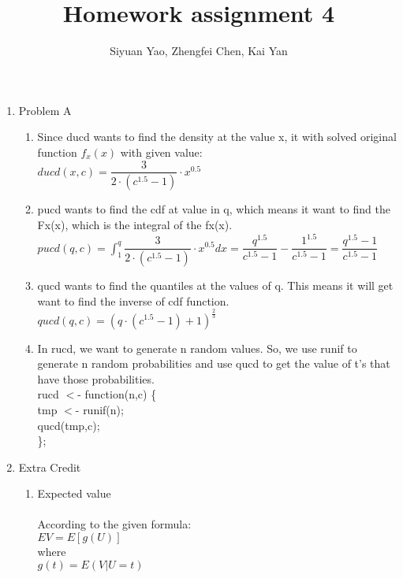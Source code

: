 \documentclass{amsart}
\newcommand\tab[1][1cm]{\hspace*{#1}}
\begin{document}
\title{Homework assignment 4}
\author{Siyuan Yao, Zhengfei Chen, Kai Yan}
\maketitle

\thispagestyle{empty}
\pagestyle{empty}

\begin{enumerate}
\item Problem A\\
\begin{enumerate}
\item Since ducd wants to find the density at the value x, it with solved original function $f_x(x)$ with given value:\\
$ducd(x,c)=\dfrac{3}{2\cdot(c^{1.5}-1)}\cdot x^{0.5}$\\
\item pucd wants to find the cdf at value in q, which means it want to find the Fx(x), which is the integral of the fx(x).\\
$pucd(q,c)=\displaystyle\int^{q}_{1} \dfrac{3}{2\cdot(c^{1.5}-1)}\cdot x^{0.5} dx=\dfrac{q^{1.5}}{c^{1.5}-1}-\dfrac{1^{1.5}}{c^{1.5}-1}=\dfrac{q^{1.5}-1}{c^{1.5}-1}$\\
\item qucd wants to find the quantiles at the values of q. This means it will get want to find the inverse of cdf function.\\
$qucd(q,c)=(q\cdot(c^{1.5}-1)+1)^{\frac{2}{3}}$\\
\item In rucd, we want to generate n random values. So, we use runif to generate n random probabilities and use qucd to get the value of t's that have those probabilities.\\
rucd $<$- function(n,c) \{\\
\tab tmp $<$- runif(n);\\
\tab qucd(tmp,c);\\
\};\\
\end{enumerate}
\item Extra Credit
\begin{enumerate}
\item Expected value\\\\
According to the given formula:\\
$ EV = E[g(U)]$\\
where \\$g(t) = E(V | U = t)$\\

\end{enumerate}
\end{enumerate}
\end{document}
